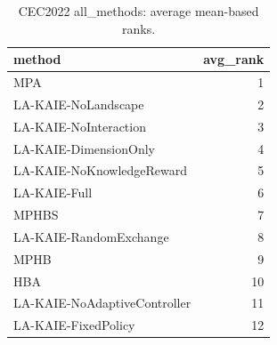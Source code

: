 \begin{table}[t]
\centering
\scriptsize
\caption{CEC2022 all_methods: average mean-based ranks.}
\label{tab:cec2022_all_methods_ranks}
\begin{tabular}{lr}
\toprule
method & avg\_rank \\
\midrule
MPA & 1 \\
LA-KAIE-NoLandscape & 2 \\
LA-KAIE-NoInteraction & 3 \\
LA-KAIE-DimensionOnly & 4 \\
LA-KAIE-NoKnowledgeReward & 5 \\
LA-KAIE-Full & 6 \\
MPHBS & 7 \\
LA-KAIE-RandomExchange & 8 \\
MPHB & 9 \\
HBA & 10 \\
LA-KAIE-NoAdaptiveController & 11 \\
LA-KAIE-FixedPolicy & 12 \\
\bottomrule
\end{tabular}
\end{table}
